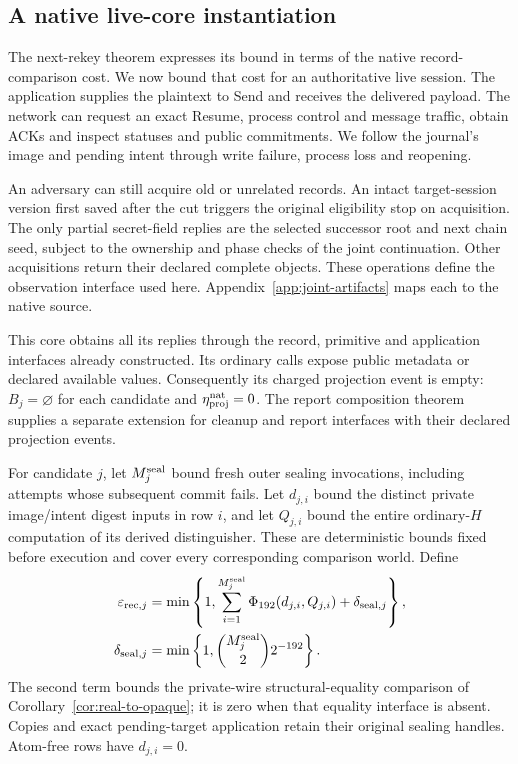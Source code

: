 \subsection{A native live-core instantiation}
\label{sec:live-core-instantiation}

The next-rekey theorem expresses its bound in terms of the native
record-comparison cost. We now bound that cost for an authoritative live
session. The application supplies the plaintext to Send and receives the
delivered payload. The network can request an
exact Resume, process control and message traffic, obtain ACKs and
inspect statuses and public commitments. We follow the journal's
image and pending intent through write failure, process loss
and reopening.

An adversary can still acquire old or unrelated records. An intact
target-session version first saved after the cut triggers the original
eligibility stop on acquisition. The only partial secret-field replies
are the selected successor root and next chain seed, subject to the
ownership and phase checks of the joint continuation. Other acquisitions
return their declared complete objects. These operations define the
observation interface used here. Appendix~\ref{app:joint-artifacts}
maps each to the native source.

This core obtains all its replies through the record, primitive and
application interfaces already constructed. Its ordinary calls expose
public metadata or declared available values. Consequently its charged
projection event is empty: $B_j=\varnothing$ for each candidate and
$\eta_{\rm proj}^{\rm nat}=0$. The report composition theorem supplies a
separate extension for cleanup and report interfaces with their declared
projection events.

For candidate $j$, let $M_j^{\rm seal}$ bound fresh outer sealing
invocations, including attempts whose subsequent commit fails. Let
$d_{j,i}$ bound the distinct private image/intent digest inputs in row $i$,
and let $Q_{j,i}$ bound the entire ordinary-$H$ computation of its derived
distinguisher. These are deterministic bounds fixed before execution and
cover every corresponding comparison world. Define
\begin{equation}
\begin{split}
 \varepsilon_{{\rm rec},j}
 &=\min\left\{1,
     \sum_{i=1}^{M_j^{\rm seal}}\Phi_{192}(d_{j,i},Q_{j,i})
       +\delta_{{\rm seal},j}\right\},\\
 \delta_{{\rm seal},j}
 &=\min\left\{1,\binom{M_j^{\rm seal}}{2}2^{-192}\right\}.
\end{split}
\label{eq:live-core-record-cost}
\end{equation}
The second term bounds the private-wire structural-equality comparison of
Corollary~\ref{cor:real-to-opaque}; it is zero when that equality interface
is absent. Copies and exact pending-target application retain their
original sealing handles. Atom-free rows have $d_{j,i}=0$.

